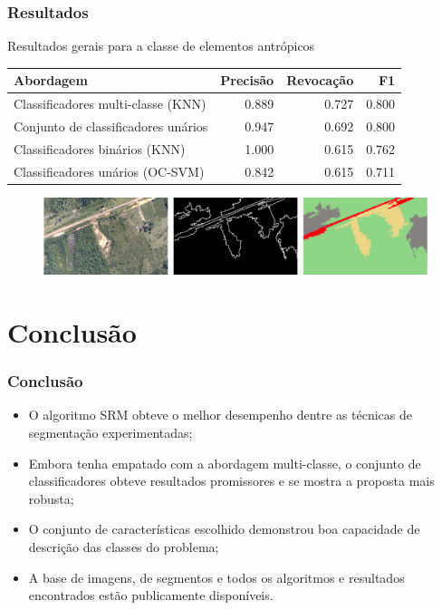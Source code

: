 \documentclass[t]{beamer}
\begin{document}
\begin{frame}[c]
	\frametitle{Resultados}
	
	\centering
	Resultados gerais para a classe de elementos antrópicos

	\small{
		\begin{table}[h]
		\centering
		\begin{tabulary}{\linewidth}{|L|R|R|R|}
		\hline
		\textbf{Abordagem}  & \textbf{Precisão} & \textbf{Revocação} & \textbf{F1} \\ \hline
		Classificadores multi-classe (KNN)   & 0.889 & 0.727 & 0.800 \\ \hline
		Conjunto de classificadores unários  & 0.947 & 0.692 & 0.800 \\ \hline
		Classificadores binários (KNN)       & 1.000 & 0.615 & 0.762 \\ \hline
		Classificadores unários (OC-SVM)     & 0.842 & 0.615 & 0.711 \\ \hline
		\end{tabulary}
		\end{table}
	}

	\begin{figure}
		\includegraphics[width=\textwidth]{imgs/resultado_final}
	\end{figure}
\end{frame}


\section{Conclusão}

\begin{frame}[c]
	\frametitle{Conclusão}

	\begin{itemize}
		\item O algoritmo SRM obteve o melhor desempenho dentre as técnicas de segmentação experimentadas;
		\item Embora tenha empatado com a abordagem multi-classe, o conjunto de classificadores obteve resultados promissores e se mostra a proposta mais robusta;
		\item O conjunto de características escolhido demonstrou boa capacidade de descrição das classes do problema;
		\item A base de imagens, de segmentos e todos os algoritmos e resultados encontrados estão publicamente disponíveis.
	\end{itemize}
\end{frame}
\end{document}

